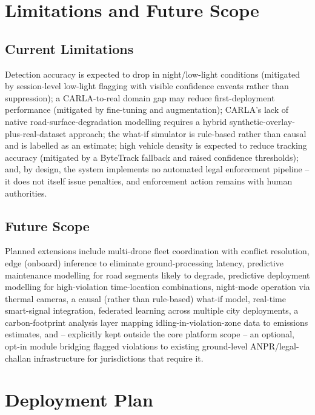 \documentclass[conference]{IEEEtran}
\begin{document}
\section{Limitations and Future Scope}
\label{sec:limitations}

\subsection{Current Limitations}

Detection accuracy is expected to drop in night/low-light conditions (mitigated by session-level low-light flagging with visible confidence caveats rather than suppression); a CARLA-to-real domain gap may reduce first-deployment performance (mitigated by fine-tuning and augmentation); CARLA's lack of native road-surface-degradation modelling requires a hybrid synthetic-overlay-plus-real-dataset approach; the what-if simulator is rule-based rather than causal and is labelled as an estimate; high vehicle density is expected to reduce tracking accuracy (mitigated by a ByteTrack fallback and raised confidence thresholds); and, by design, the system implements no automated legal enforcement pipeline -- it does not itself issue penalties, and enforcement action remains with human authorities.

\subsection{Future Scope}
\label{sec:future}

Planned extensions include multi-drone fleet coordination with conflict resolution, edge (onboard) inference to eliminate ground-processing latency, predictive maintenance modelling for road segments likely to degrade, predictive deployment modelling for high-violation time-location combinations, night-mode operation via thermal cameras, a causal (rather than rule-based) what-if model, real-time smart-signal integration, federated learning across multiple city deployments, a carbon-footprint analysis layer mapping idling-in-violation-zone data to emissions estimates, and -- explicitly kept outside the core platform scope -- an optional, opt-in module bridging flagged violations to existing ground-level ANPR/legal-challan infrastructure for jurisdictions that require it.

\section{Deployment Plan}
\label{sec:deployment}
\end{document}
